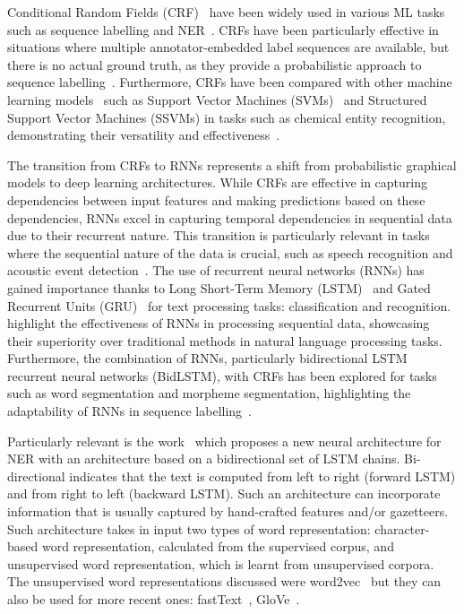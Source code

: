 Conditional Random Fields (CRF)~\cite{lafferty2001conditional} have been widely used in various ML tasks such as sequence labelling and NER~\cite{rodriguez2013sequence}. 
CRFs have been particularly effective in situations where multiple annotator-embedded label sequences are available, but there is no actual ground truth, as they provide a probabilistic approach to sequence labelling~\cite{rodriguez2013sequence}. 
Furthermore, CRFs have been compared with other machine learning models~\cite{tang2015aComparison} such as Support Vector Machines (SVMs)~\cite{boser1992training} and Structured Support Vector Machines (SSVMs) in tasks such as chemical entity recognition, demonstrating their versatility and effectiveness~\cite{tang2015aComparison, naseem2021aComparative, yang2019madex}.


The transition from CRFs to RNNs represents a shift from probabilistic graphical models to deep learning architectures. 
While CRFs are effective in capturing dependencies between input features and making predictions based on these dependencies, RNNs excel in capturing temporal dependencies in sequential data due to their recurrent nature. 
This transition is particularly relevant in tasks where the sequential nature of the data is crucial, such as speech recognition and acoustic event detection~\cite{graves2013speech,tian2020artificial}.
The use of recurrent neural networks (RNNs) has gained importance thanks to Long Short-Term Memory (LSTM)~\cite{sak2014long} and Gated Recurrent Units (GRU)~\cite{cho2001learning} for text processing tasks: classification and recognition. 
\cite{kim2022research, lyu2020combine,li2022channel, siswantining2023spratama} highlight the effectiveness of RNNs in processing sequential data, showcasing their superiority over traditional methods in natural language processing tasks.
Furthermore, the combination of RNNs, particularly bidirectional LSTM recurrent neural networks (BidLSTM), with CRFs has been explored for tasks such as word segmentation and morpheme segmentation, highlighting the adaptability of RNNs in sequence labelling~\cite{huang2015bidirectional}.

Particularly relevant is the work~\cite{lample2016neural} which proposes a new neural architecture for NER with an architecture based on a bidirectional set of LSTM chains. 
Bi-directional indicates that the text is computed from left to right (forward LSTM) and from right to left (backward LSTM). 
Such an architecture can incorporate information that is usually captured by hand-crafted features and/or gazetteers. 
Such architecture takes in input two types of word representation: character-based word representation, calculated from the supervised corpus, and unsupervised word representation, which is learnt from unsupervised corpora. 
The unsupervised word representations discussed were word2vec~\cite{mikolov2013efficient} but they can also be used for more recent ones: fastText~\cite{joulin2016fasttext}, GloVe~\cite{pennington2014glove}.

